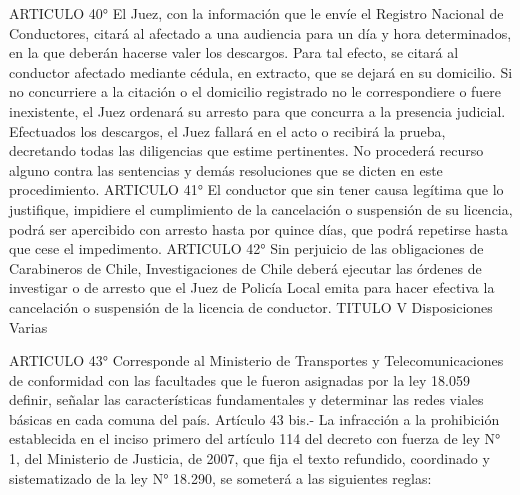     ARTICULO 40° El Juez, con la información que le envíe el Registro Nacional de Conductores, citará al afectado a una audiencia para un día y hora determinados, en la que deberán hacerse valer los descargos.
    Para tal efecto, se citará al conductor afectado mediante cédula, en extracto, que se dejará en su domicilio. Si no concurriere a la citación o el domicilio registrado no le correspondiere o fuere inexistente, el Juez ordenará su arresto para que concurra a la presencia judicial.
    Efectuados los descargos, el Juez fallará en el acto o recibirá la prueba, decretando todas las diligencias que estime pertinentes.
    No procederá recurso alguno contra las sentencias y demás resoluciones que se dicten en este procedimiento.
    ARTICULO 41° El conductor que sin tener causa legítima que lo justifique, impidiere el cumplimiento de la cancelación o suspensión de su licencia, podrá ser apercibido con arresto hasta por quince días, que podrá repetirse hasta que cese el impedimento.
    ARTICULO 42° Sin perjuicio de las obligaciones de Carabineros de Chile, Investigaciones de Chile deberá ejecutar las órdenes de investigar o de arresto que el Juez de Policía Local emita para hacer efectiva la cancelación o suspensión de la licencia de conductor.
    TITULO V
    Disposiciones Varias



    ARTICULO 43° Corresponde al Ministerio de Transportes y Telecomunicaciones de conformidad con las facultades que le fueron asignadas por la ley 18.059 definir, señalar las características fundamentales y determinar las redes viales básicas en cada comuna del país.
    Artículo 43 bis.- La infracción a la prohibición establecida en el inciso primero del artículo 114 del decreto con fuerza de ley N° 1, del Ministerio de Justicia, de 2007, que fija el texto refundido, coordinado y sistematizado de la ley N° 18.290, se someterá a las siguientes reglas:

